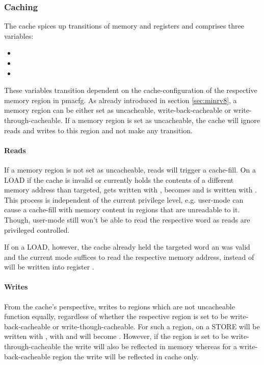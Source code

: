 \subsubsection{Caching}

The cache spices up transitions of memory and registers and comprises three variables:
\begin{itemize}
    \item {}
    \item {}
    \item {}
\end{itemize}

These variables transition dependent on the cache-configuration of the respective memory region in \gls{pmacfg}.
As already introduced in section \ref{sec:minrv8}, a memory region can be either set as uncacheable, write-back-cacheable or write-through-cacheable.
If a memory region is set as uncacheable, the cache will ignore reads and writes to this region and not make any transition.

\paragraph{Reads}
If a memory region is not set as uncacheable, reads will trigger a cache-fill.
On a LOAD if the cache is invalid or currently holds the contents of a different memory address than targeted,  gets written with ,  becomes  and  is written with .
This process is independent of the current privilege level, e.g. user-mode can cause a cache-fill with memory content in regions that are unreadable to it.
Though, user-mode still won't be able to read the respective word as reads are privileged controlled.

If on a LOAD, however, the cache already held the targeted word an was valid and the current mode suffices to read the respective memory address,  instead of  will be written into register .

\paragraph{Writes}
From the cache's perspective, writes to regions which are not uncacheable function equally, regardless of whether the respective region is set to be write-back-cacheable or write-though-cacheable.
For such a region, on a STORE  will be written with ,  with  and  will become .
However, if the region is set to be write-through-cacheable the write will also be reflected in memory whereas for a write-back-cacheable region the write will be reflected in cache only.


